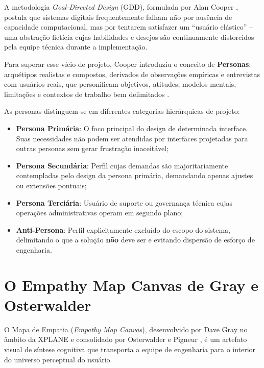 A metodologia \textit{Goal-Directed Design} (GDD), formulada por Alan Cooper \cite{cooper1999, cooper2014}, postula que sistemas digitais frequentemente falham não por ausência de capacidade computacional, mas por tentarem satisfazer um ``usuário elástico'' -- uma abstração fictícia cujas habilidades e desejos são continuamente distorcidos pela equipe técnica durante a implementação.

Para superar esse vício de projeto, Cooper introduziu o conceito de \textbf{Personas}: arquétipos realistas e compostos, derivados de observações empíricas e entrevistas com usuários reais, que personificam objetivos, atitudes, modelos mentais, limitações e contextos de trabalho bem delimitados \cite{cooper2014}. 

As personas distinguem-se em diferentes categorias hierárquicas de projeto:
\begin{itemize}
    \item \textbf{Persona Primária}: O foco principal do design de determinada interface. Suas necessidades não podem ser atendidas por interfaces projetadas para outras personas sem gerar frustração inaceitável;
    \item \textbf{Persona Secundária}: Perfil cujas demandas são majoritariamente contempladas pelo design da persona primária, demandando apenas ajustes ou extensões pontuais;
    \item \textbf{Persona Terciária}: Usuário de suporte ou governança técnica cujas operações administrativas operam em segundo plano;
    \item \textbf{Anti-Persona}: Perfil explicitamente excluído do escopo do sistema, delimitando o que a solução \textbf{não} deve ser e evitando dispersão de esforço de engenharia.
\end{itemize}

\section{O Empathy Map Canvas de Gray e Osterwalder}
\label{sec_empathy_map_canvas}

O Mapa de Empatia (\textit{Empathy Map Canvas}), desenvolvido por Dave Gray \cite{gray2010} no âmbito da XPLANE e consolidado por Osterwalder e Pigneur \cite{osterwalder2014}, é um artefato visual de síntese cognitiva que transporta a equipe de engenharia para o interior do universo perceptual do usuário.

